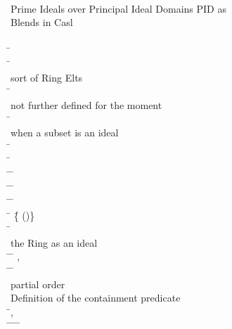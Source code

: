 \begin{hetcasl}
 \\
\\
 \\
{\small{}\KW{\%\%} Prime Ideals over Principal Ideal Domains \Ax{(}PID\Ax{)} as}\\
{\small{}\KW{\%\%} Blends in Casl}\\
\\
\SPEC \= \Ax{=}\\
\> \SORT \=\\
\>\> {\small{}\KW{\%\%} sort of Ring Elts}\\
\> \SORT \=\\
\>\> {\small{}\KW{\%\%} not further defined for the moment}\\
\> \PRED \= \Ax{:} \\
\>\> {\small{}\KW{\%\%} when a subset is an ideal}\\
\> \OP \= \Ax{:} \\
\> \OP \= \Ax{:} \\
\> \OP \=\Ax{\_\_}\Ax{*}\Ax{\_\_} \Ax{:} \= \Ax{\times}  \Ax{\rightarrow} \\
\> \OP \=\Ax{\_\_}\Ax{+}\Ax{\_\_} \Ax{:} \= \Ax{\times}  \Ax{\rightarrow} \\
\> \PRED \=\Ax{\_\_}\Ax{\_\_} \Ax{:} \= \Ax{\times} \\
\> \SORT \= \Ax{=} \=\{ \Ax{:}  \Ax{\bullet} ()\}\\
\> \OP \= \Ax{:} \\
\>\> {\small{}\KW{\%\%} the Ring as an ideal}\\
\> \OP \=\Ax{\_\_}\Ax{**}\Ax{\_\_} \Ax{:} \= \Ax{\times}  \Ax{\rightarrow} ,  \\
\> \PRED \=\Ax{\_\_}\Ax{\_\_} \Ax{:} \= \Ax{\times} \\
\>\> {\small{}\KW{\%\%} partial order}\\
\>\> {\small{}\KW{\%\%}Definition of the containment predicate}\\
\> \Ax{\forall} \=,  \Ax{:}  \\
\> \Ax{\bullet} \=   \Ax{\Leftrightarrow} \=\Ax{\forall}  \Ax{:}  \Ax{\bullet} \=   \Ax{\Rightarrow} \=   \\

\end{hetcasl}
